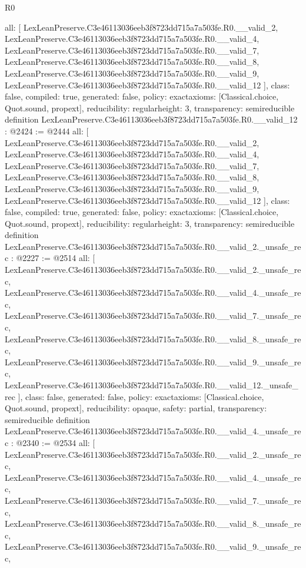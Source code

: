 \begin{lexlean}{R0}
\begin{coremodule}
{  all: [
    LexLeanPreserve.C3e46113036eeb3f8723dd715a7a503fe.R0.__valid_2,
    LexLeanPreserve.C3e46113036eeb3f8723dd715a7a503fe.R0.__valid_4,
    LexLeanPreserve.C3e46113036eeb3f8723dd715a7a503fe.R0.__valid_7,
    LexLeanPreserve.C3e46113036eeb3f8723dd715a7a503fe.R0.__valid_8,
    LexLeanPreserve.C3e46113036eeb3f8723dd715a7a503fe.R0.__valid_9,
    LexLeanPreserve.C3e46113036eeb3f8723dd715a7a503fe.R0.__valid_12
  ],
  class: false,
  compiled: true,
  generated: false,
  policy: exact{axioms: [Classical.choice, Quot.sound, propext]},
  reducibility: regular{height: 3},
  transparency: semireducible
}
definition LexLeanPreserve.C3e46113036eeb3f8723dd715a7a503fe.R0.__valid_12 : @2424 := @2444 {
  all: [
    LexLeanPreserve.C3e46113036eeb3f8723dd715a7a503fe.R0.__valid_2,
    LexLeanPreserve.C3e46113036eeb3f8723dd715a7a503fe.R0.__valid_4,
    LexLeanPreserve.C3e46113036eeb3f8723dd715a7a503fe.R0.__valid_7,
    LexLeanPreserve.C3e46113036eeb3f8723dd715a7a503fe.R0.__valid_8,
    LexLeanPreserve.C3e46113036eeb3f8723dd715a7a503fe.R0.__valid_9,
    LexLeanPreserve.C3e46113036eeb3f8723dd715a7a503fe.R0.__valid_12
  ],
  class: false,
  compiled: true,
  generated: false,
  policy: exact{axioms: [Classical.choice, Quot.sound, propext]},
  reducibility: regular{height: 3},
  transparency: semireducible
}
definition LexLeanPreserve.C3e46113036eeb3f8723dd715a7a503fe.R0.__valid_2._unsafe_rec : @2227 := @2514 {
  all: [
    LexLeanPreserve.C3e46113036eeb3f8723dd715a7a503fe.R0.__valid_2._unsafe_rec,
    LexLeanPreserve.C3e46113036eeb3f8723dd715a7a503fe.R0.__valid_4._unsafe_rec,
    LexLeanPreserve.C3e46113036eeb3f8723dd715a7a503fe.R0.__valid_7._unsafe_rec,
    LexLeanPreserve.C3e46113036eeb3f8723dd715a7a503fe.R0.__valid_8._unsafe_rec,
    LexLeanPreserve.C3e46113036eeb3f8723dd715a7a503fe.R0.__valid_9._unsafe_rec,
    LexLeanPreserve.C3e46113036eeb3f8723dd715a7a503fe.R0.__valid_12._unsafe_rec
  ],
  class: false,
  generated: false,
  policy: exact{axioms: [Classical.choice, Quot.sound, propext]},
  reducibility: opaque{},
  safety: partial,
  transparency: semireducible
}
definition LexLeanPreserve.C3e46113036eeb3f8723dd715a7a503fe.R0.__valid_4._unsafe_rec : @2340 := @2534 {
  all: [
    LexLeanPreserve.C3e46113036eeb3f8723dd715a7a503fe.R0.__valid_2._unsafe_rec,
    LexLeanPreserve.C3e46113036eeb3f8723dd715a7a503fe.R0.__valid_4._unsafe_rec,
    LexLeanPreserve.C3e46113036eeb3f8723dd715a7a503fe.R0.__valid_7._unsafe_rec,
    LexLeanPreserve.C3e46113036eeb3f8723dd715a7a503fe.R0.__valid_8._unsafe_rec,
    LexLeanPreserve.C3e46113036eeb3f8723dd715a7a503fe.R0.__valid_9._unsafe_rec,
}
\end{coremodule}
\end{lexlean}
